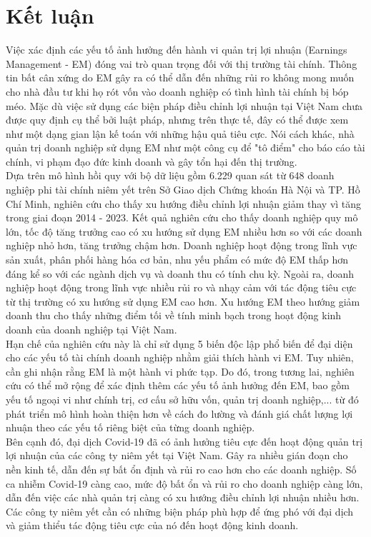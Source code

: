 \documentclass[a4paper]{article}
\begin{document}
\section{Kết luận}
Việc xác định các yếu tố ảnh hưởng đến hành vi quản trị lợi nhuận (Earnings Management - EM) đóng vai trò quan trọng đối với thị trường tài chính. Thông tin bất cân xứng do EM gây ra có thể dẫn đến những rủi ro không mong muốn cho nhà đầu tư khi họ rót vốn vào doanh nghiệp có tình hình tài chính bị bóp méo. Mặc dù việc sử dụng các biện pháp điều chỉnh lợi nhuận tại Việt Nam chưa được quy định cụ thể bởi luật pháp, nhưng trên thực tế, đây có thể được xem như một dạng gian lận kế toán với những hậu quả tiêu cực. Nói cách khác, nhà quản trị doanh nghiệp sử dụng EM như một công cụ để "tô điểm" cho báo cáo tài chính, vi phạm đạo đức kinh doanh và gây tổn hại đến thị trường.\\
\indent Dựa trên mô hình hồi quy với bộ dữ liệu gồm 6.229 quan sát từ 648 doanh nghiệp phi tài chính niêm yết trên Sở Giao dịch Chứng khoán Hà Nội và TP. Hồ Chí Minh, nghiên cứu cho thấy xu hướng điều chỉnh lợi nhuận giảm thay vì tăng trong giai đoạn 2014 - 2023. Kết quả nghiên cứu cho thấy doanh nghiệp quy mô lớn, tốc độ tăng trưởng cao có xu hướng sử dụng EM nhiều hơn so với các doanh nghiệp nhỏ hơn, tăng trưởng chậm hơn. Doanh nghiệp hoạt động trong lĩnh vực sản xuất, phân phối hàng hóa cơ bản, nhu yếu phẩm có mức độ EM thấp hơn đáng kể so với các ngành dịch vụ và doanh thu có tính chu kỳ. Ngoài ra, doanh nghiệp hoạt động trong lĩnh vực nhiều rủi ro và nhạy cảm với tác động tiêu cực từ thị trường có xu hướng sử dụng EM cao hơn. Xu hướng EM theo hướng giảm doanh thu cho thấy những điểm tối về tính minh bạch trong hoạt động kinh doanh của doanh nghiệp tại Việt Nam.\\
\indent Hạn chế của nghiên cứu này là chỉ sử dụng 5 biến độc lập phổ biến để đại diện cho các yếu tố tài chính doanh nghiệp nhằm giải thích hành vi EM. Tuy nhiên, cần ghi nhận rằng EM là một hành vi phức tạp. Do đó, trong tương lai, nghiên cứu có thể mở rộng để xác định thêm các yếu tố ảnh hưởng đến EM, bao gồm yếu tố ngoại vi như chính trị, cơ cấu sở hữu vốn, quản trị doanh nghiệp,... từ đó phát triển mô hình hoàn thiện hơn về cách đo lường và đánh giá chất lượng lợi nhuận theo các yếu tố riêng biệt của từng doanh nghiệp.\\
\indent Bên cạnh đó, đại dịch Covid-19 đã có ảnh hưởng tiêu cực đến hoạt động quản trị lợi nhuận của các công ty niêm yết tại Việt Nam. Gây ra nhiều gián đoạn cho nền kinh tế, dẫn đến sự bất ổn định và rủi ro cao hơn cho các doanh nghiệp. Số ca nhiễm Covid-19 càng cao, mức độ bất ổn và rủi ro cho doanh nghiệp càng lớn, dẫn đến việc các nhà quản trị càng có xu hướng điều chỉnh lợi nhuận nhiều hơn. Các công ty niêm yết cần có những biện pháp phù hợp để ứng phó với đại dịch và giảm thiểu tác động tiêu cực của nó đến hoạt động kinh doanh.
\end{document}
